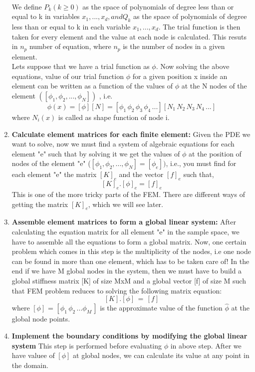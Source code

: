 \documentclass[9pt]{article}
\begin{document}
\begin{enumerate}
\[\]
\\
We define $P_k (k \geq 0)$ as the space of polynomials of degree less than or equal
to k in variables $x_1,...,x_d,and Q_k$ as the space of polynomials of degree less
than or equal to k in each variable $x_1,...,x_d$.
The trial function is then taken for every element and the value at each node is calculated. This resuts in $n_p$ number of equation, where $n_p$ is the number of nodes in a given element.\\
Lets suppose that we have a trial function as $\phi$. Now solving the above equations, value of our trial function $\phi$ for a given position x inside an element can be written as a function of the values of $\phi$ at the N nodes of the element
$([\phi_1,\phi_2,...,\phi_N])$ , i.e. 
\[
\phi(x) = [\phi][N] = [\phi_1\, \phi_2\, \phi_3\, \phi_4\, ...][N_1\, N_2\, N_3\, N_4\,...]
\]
where $N_i(x)$ is called as shape function of node i.
  \\
  \item \textbf{Calculate element matrices for each finite element:} Given the PDE we want to solve, now we must find a system of algebraic equations for each element "e" such that by solving it we get the values of $\phi$ at the position of nodes of the element "e" 
  ($[\phi_1, \phi_2,..., \phi_N] = [\phi_e] )$, i.e., you must find
for each element "e" the matrix $[K]_e$ and the vector $[f ]_e$ such that,
\[
[K]_e.[\phi]_e = [f]_e
\]  
This is one of the more tricky parts of the FEM. There are different ways of getting the
matrix $[K]_e$, which we will see later.
  \\
  \item \textbf{Assemble element matrices to form a global linear system:} After calculating the equation matrix for all element "e" in the sample space, we have to assemble all the equations to form a global matrix. Now, one certain problem which comes in this step is the multiplicity of the nodes, i.e one node can be found in more than one element, which has to be taken care of!
  In the end if we have M global nodes in the system, then we must have to build a global stiffness matrix [K] of size MxM and a global vector [f] of size M such that FEM problem reduces to solving the following matrix equation:\\
  \[
    [K].[\phi] \,=\, [f]   
  \]  
  where $[\phi]$ = $[\phi_1\, \phi_2\, ... \phi_M\,]$ is the approximate value of the function $\hat{\phi}$ at the global node points. 
\\ 
  \item \textbf{Implement the boundary conditions by modifying the global linear system}
  This step is performed before evaluating $\phi$ in above step. After we have valuee of $[\phi]$ at global nodes, we can calculate its value at any point in the domain.
\end{enumerate}
\end{document}
